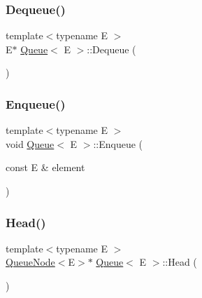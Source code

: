 \mbox{\label{classQueue_a434d465001c3078e999f7a89a8af84c0}} 
\subsubsection{\texorpdfstring{Dequeue()}{Dequeue()}}
{\footnotesize\ttfamily template$<$typename E $>$ \\
E$\ast$ \mbox{\hyperlink{classQueue}{Queue}}$<$ E $>$\+::Dequeue (\begin{DoxyParamCaption}{ }\end{DoxyParamCaption})\hspace{0.3cm}{\ttfamily [inline]}}

\mbox{\label{classQueue_abaa2e7175457307bca74f5562cbdaaa9}} 
\subsubsection{\texorpdfstring{Enqueue()}{Enqueue()}}
{\footnotesize\ttfamily template$<$typename E $>$ \\
void \mbox{\hyperlink{classQueue}{Queue}}$<$ E $>$\+::Enqueue (\begin{DoxyParamCaption}\item[{const E \&}]{element }\end{DoxyParamCaption})\hspace{0.3cm}{\ttfamily [inline]}}

\mbox{\label{classQueue_a71aa0154ef75bb87a53b6af1829fcd5e}} 
\subsubsection{\texorpdfstring{Head()}{Head()}\hspace{0.1cm}{\footnotesize\ttfamily [1/2]}}
{\footnotesize\ttfamily template$<$typename E $>$ \\
\mbox{\hyperlink{classQueueNode}{Queue\+Node}}$<$E$>$$\ast$ \mbox{\hyperlink{classQueue}{Queue}}$<$ E $>$\+::Head (\begin{DoxyParamCaption}{ }\end{DoxyParamCaption})\hspace{0.3cm}{\ttfamily [inline]}}

